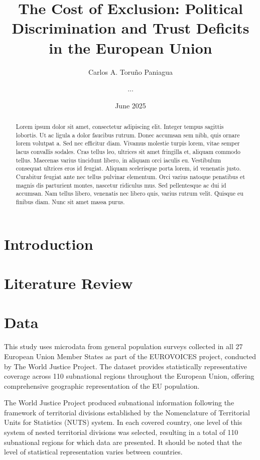 \documentclass{article}
\title{The Cost of Exclusion: Political Discrimination and Trust Deficits in the European Union}
\author[1]{Carlos A. Toruño Paniagua}
\author[2]{...}
\affil[1,2]{\emph{The World Justice Project}}
\date{June 2025}
\begin{document}
\maketitle

\begin{abstract}
Lorem ipsum dolor sit amet, consectetur adipiscing elit. Integer tempus sagittis lobortis. Ut ac ligula a dolor faucibus rutrum. Donec accumsan sem nibh, quis ornare lorem volutpat a. Sed nec efficitur diam. Vivamus molestie turpis lorem, vitae semper lacus convallis sodales. Cras tellus leo, ultrices sit amet fringilla et, aliquam commodo tellus. Maecenas varius tincidunt libero, in aliquam orci iaculis eu. Vestibulum consequat ultrices eros id feugiat. Aliquam scelerisque porta lorem, id venenatis justo. Curabitur feugiat ante nec tellus pulvinar elementum. Orci varius natoque penatibus et magnis dis parturient montes, nascetur ridiculus mus. Sed pellentesque ac dui id accumsan. Nam tellus libero, venenatis nec libero quis, varius rutrum velit. Quisque eu finibus diam. Nunc sit amet massa purus.
\end{abstract}

\section{Introduction}

\section{Literature Review}

\section{Data}

This study uses microdata from general population surveys collected in all 27 European Union Member States as part of the EUROVOICES project, conducted by The World Justice Project. The dataset provides statistically representative coverage across 110 subnational regions throughout the European Union, offering comprehensive geographic representation of the EU population.

The World Justice Project produced subnational information following the framework of territorial divisions established by the Nomenclature of Territorial Units for Statistics (NUTS) system. In each covered country, one level of this system of nested territorial divisions was selected, resulting in a total of 110 subnational regions for which data are presented. It should be noted that the level of statistical representation varies between countries.
\end{document}
